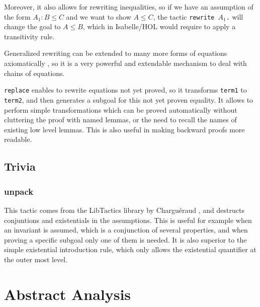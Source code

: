 \documentclass[headsepline,footsepline,footinclude=false,oneside,fontsize=11pt,paper=a4,listof=totoc,bibliography=totoc]{scrbook} %
\begin{document}
Moreover, it also allows for rewriting inequalities, so if we have an assumption of the form $A_1: B \leq C$ and we want to show $A \leq C$, the tactic \verb|rewrite |$A_1$\verb|.| will change the goal to $A \leq B$, which in Isabelle/HOL would require to apply a transitivity rule.

Generalized rewriting can be extended to many more forms of equations axiomatically \cite{CoqRefMan}, so it is a very powerful and extendable mechanism to deal with chains of equations.

\verb|replace| enables to rewrite equations not yet proved, so it transforms \verb|term1| to \verb|term2|, and then generates a subgoal for this not yet proven equality. It allows to perform simple transformations which can be proved automatically without cluttering the proof with named lemmas, or the need to recall the names of existing low level lemmas. This is also useful in making backward proofs more readable.

\subsection{Trivia}

\subsubsection{unpack}

This tactic comes from the LibTactics library by Charguéraud \cite{LibTactics}, and destructs conjuntions and existentials in the assumptions. This is useful for example when an invariant is assumed, which is a conjunction of several properties, and when proving a specific subgoal only one of them is needed. It is also superior to the simple existential introduction rule, which only allows the existential quantifier at the outer most level.


\section{Abstract Analysis}
\end{document}
